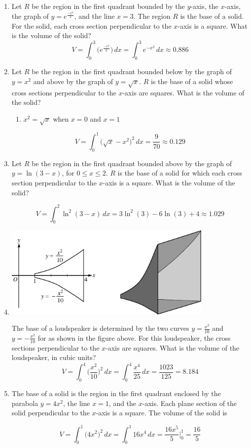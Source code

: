\documentclass[12pt]{article}
\begin{document}
\begin{enumerate}
    \item Let $R$ be the region in the first quadrant bounded by the $y$-axis, the $x$-axis, the graph of $y=e^{\frac{-x^2}{2}}$, and the line $x=3$. The region $R$ is the base of a solid. For the solid, each cross section perpendicular to the $x$-axis is a square. What is the volume of the solid?
    $$V=\int_{0}^{3} \biggr(e^{\frac{-x^2}{2}}\biggr) \, dx = \int_{0}^{3} e^{-x^2} \, dx \approx \boxed{0.886} $$
    \item Let $R$ be the region in the first quadrant bounded below by the graph of $y=x^2$ and above by the graph of $y=\sqrt{x}$. $R$ is the base of a solid whose cross sections perpendicular to the $x$-axis are squares. What is the volume of the solid?
    \begin{enumerate}
        \item $x^2=\sqrt{x}$ when $x=0$ and $x=1$
    \end{enumerate}
    $$V=\int_{0}^{1} \biggr(\sqrt{x}-x^2\biggr)^2\, dx =\frac{9}{70} \approx \boxed{0.129}$$

    \item Let $R$ be the region in the first quadrant bounded above by the graph of $y=\ln(3-x)$, for $0 \leq x \leq 2$. $R$ is the base of a solid for which each cross section perpendicular to the $x$-axis is a square. What is the volume of the solid?

    $$V=\int_{0}^{2} \ln^2(3-x) \, dx = 3\ln^2(3)-6\ln(3)+4 \approx \boxed{1.029}$$

    \item
    \begin{center}
        \includegraphics[width=4in]{4.022.png}
    \end{center}
    The base of a loudspeaker is determined by the two curves $y=\frac{x^2}{10}$ and $y=- \frac{x^2}{10}$ for as shown in the figure above. For this loudspeaker, the cross sections perpendicular to the $x$-axis are squares. What is the volume of the loudspeaker, in cubic units?
$$V=\int_{0}^{4} \biggr(\frac{x^2}{10}\biggr)^2 \, dx  = \int_{0}^{4} \frac{x^4}{25} \, dx = \frac{1023}{125} = \boxed{8.184}$$
    \item The base of a solid is the region in the first quadrant enclosed by the parabola $y=4x^2$, the line $x=1$, and the $x$-axis. Each plane section of the solid perpendicular to the $x$-axis is a square. The volume of the solid is

    $$V=\int_{0}^{1} \big(4x^2\big)^2 \, dx = \int_{0}^{1} 16x^4 \, dx = \frac{16x^5}{5}\biggr\rvert_{0}^{1}=\boxed{\frac{16}{5}}$$

\end{enumerate}
\end{document}
